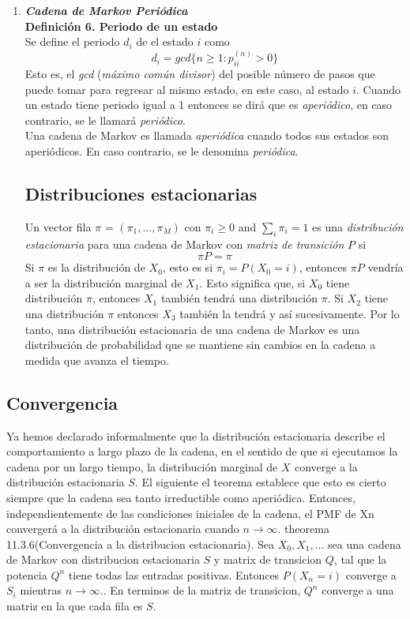 \documentclass[10pt,a4paper]{article}
\theoremstyle{definition}
\theoremstyle{remark}
\begin{document}
\begin{multicols}{2}
\begin{enumerate}
\item \textbf{\textit{Cadena de Markov Periódica}}\\

\textbf{Definición 6. Periodo de un estado}\\
Se define el periodo $d_{i}$ de el estado $i$ como
\[
d_{i} = gcd\{n\geq1:p_{ii}^{(n)}>0\}
\]
Esto es, el \textit{gcd} (\textit{máximo común divisor}) del posible número de pasos que puede tomar para regresar al mismo estado, en este caso, al estado $i$. 
Cuando un estado tiene periodo igual a 1 entonces se dirá que es \textit{aperiódico}, en caso contrario, se le llamará \textit{periódico}.\\

Una cadena de Markov es llamada \textit{aperiódica} cuando todos sus estados son aperiódicos. En caso contrario, se le denomina \textit{periódica}.

\subsection{Distribuciones estacionarias}
Un vector fila $\pi$ = $(\pi_{1},\dots,\pi_{M})$ con $\pi_{i}\geq0$ and $\sum_{i}\pi_{i} = 1$ es una \textit{distribución estacionaria} para una cadena de Markov con \textit{matriz de transición} $P$ si
\[
\pi P = \pi
\]
Si $\pi$ es la distribución de $X_{0}$, esto es si $\pi_{i} = P(X_{0} = i)$, entonces $\pi P$ vendría a ser la distribución marginal de $X_{1}$. Esto significa que, si $X_{0}$ tiene distribución $\pi$, entonces $X_{1}$ también tendrá una distribución $\pi$. Si $X_{2}$ tiene una distribución $\pi$ entonces $X_{3}$ también la tendrá y así sucesivamente.
Por lo tanto, una distribución estacionaria de una cadena de Markov es una distribución de probabilidad que se mantiene sin cambios en la cadena a medida que avanza el tiempo.
\end{enumerate}

\subsection{Convergencia}
Ya hemos declarado informalmente que la distribución estacionaria describe el
comportamiento a largo plazo de la cadena, en el sentido de que si ejecutamos la cadena por un largo tiempo,
la distribución marginal de $X_{}$ converge a la distribución estacionaria $S$. El siguiente
el teorema establece que esto es cierto siempre que la cadena sea tanto irreductible como aperiódica.
Entonces, independientemente de las condiciones iniciales de la cadena, el PMF de Xn convergerá a la distribución estacionaria cuando  $n \longrightarrow \infty.$ 
theorema 11.3.6(Convergencia a la distribucion estacionaria). Sea $X_0,X_1,\dots $ sea una cadena de Markov con distribucion estacionaria $S$ y matrix de transicion $Q$, tal que la potencia $Q^{n}$ tiene todas las entradas positivas. Entonces $P(X_{n}=i)$ converge a $S_{i}$ mientras  $n \longrightarrow \infty.$. En terminos de la matriz de transicion, $Q^{n}$ converge a una matriz en la que cada fila es $S$.\\



\end{multicols}
\end{document}
